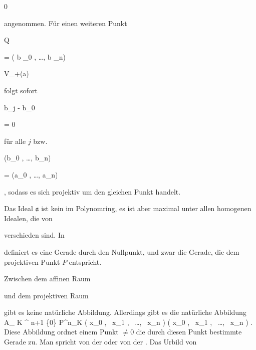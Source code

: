 {{{ \neq }{ 0
}

{  }{
}

{    }{
}

{   }{
}

}
{}{}{}
angenommen. Für einen weiteren Punkt


\mavergleichskette

{\vergleichskette

{ Q
}

{ = }{ ( b _0 , \ldots ,  b _n)
}

{ \in }{ V_+({\mathfrak a})
}

{    }{
}

{   }{
}

}
{}{}{}
folgt sofort


\mavergleichskette

{\vergleichskette

{ b_j - b_0
}

{ = }{ 0
}

{  }{
}

{    }{
}

{   }{
}

}
{}{}{}
für alle $j$ bzw.


\mavergleichskettedisp

{\vergleichskette

{ (b_0 , \ldots , b_n)
}

{ =} {  (a_0 , \ldots , a_n)
}

{ } {
}

{ } {
}

{ } {
}

}
{}{}{,}
sodass es sich projektiv um den gleichen Punkt handelt.


Das Ideal ${\mathfrak a}$ ist kein
im Polynomring, es ist aber maximal unter allen homogenen Idealen, die von

 verschieden sind. In

 definiert es eine Gerade durch den Nullpunkt, und zwar die Gerade, die dem projektiven Punkt $P$ entspricht.


}


Zwischen dem affinen Raum

 und dem projektiven Raum


 gibt es keine natürliche Abbildung. Allerdings gibt es die natürliche Abbildung
\maabbeledisp {} {{ {\mathbb A}_{ K }^{ n+1  } } \setminus\{0\} } {{\mathbb P}^{n}_{K}
} { \left( x_0   , \,  x_1  , \,  \ldots , \,  x_n                \right) } { \left( x_0   , \,  x_1  , \,  \ldots , \,  x_n                \right)
} {.}
Diese Abbildung ordnet einem Punkt $\neq 0$ die durch diesen Punkt
 {} {}
bestimmte Gerade zu. Man spricht von der  {} oder von der  {.} Das Urbild von

